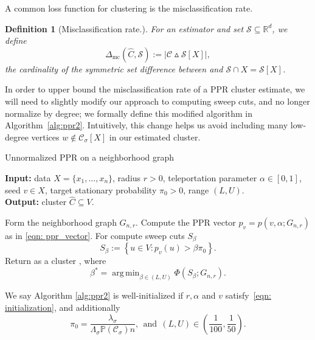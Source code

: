\documentclass[11pt,twoside]{article}
\newtheorem{definition}{Definition}
\newcommand{\set}[1]{\left\{#1\right\}}
\newcommand{\abs}[1]{\left \lvert #1 \right \rvert}
\newcommand{\Reals}{\mathbb{R}}
\newcommand{\1}{\mathbf{1}}
\newcommand{\pbf}{p}        %
\newcommand{\Xbf}{X}             %
\newcommand{\Pbb}{\mathbb{P}}
\newcommand{\Cset}{\mathcal{C}}
\newcommand{\Csig}{\Cset_{\sigma}}
\newcommand{\Cest}{\widehat{C}}
\DeclareMathOperator*{\argmin}{arg\,min}
\begin{document}
A common loss function for clustering is the misclassification rate.
\begin{definition}[Misclassification rate.]
	\label{def: symmetric_set_diff}
	For an estimator \smash{$\Cest \subseteq \Xbf$} and set
	$\mathcal{S} \subseteq \Reals^d$, we define   
	\begin{equation}
	\label{eqn: misclassification_rate}
	\Delta_{\textrm{mc}}(\Cest, \mathcal{S}) := \abs{\Cset \vartriangle \mathcal{S}[\Xbf]},
	\end{equation}
	the cardinality of the symmetric set difference between 
	\smash{$\Cest$} and $\mathcal{S} \cap \Xbf = \mathcal{S}[\Xbf]$. 
\end{definition}

In order to upper bound the misclassification rate of a PPR cluster estimate, we will need to slightly modify our approach to computing sweep cuts, and no longer normalize by degree; we formally define this modified algorithm in Algorithm~\ref{alg:ppr2}. Intuitively, this change helps us avoid including many low-degree vertices $w \not\in \Csig[\Xbf]$ in our estimated cluster.
\begin{algorithm}
	\caption{Unnormalized PPR on a neighborhood graph}
	\label{alg:ppr2}	
	{\bfseries Input:} data $\Xbf=\{x_1,\ldots,x_n\}$, radius $r > 0$, teleportation
	parameter $\alpha \in [0,1]$, seed $v \in \Xbf$, target stationary probability
	$\pi_0 > 0$, range $(L,U)$. \\     
	{\bfseries Output:} cluster $\Cest \subseteq V$.
	\begin{algorithmic}[1]
		\STATE Form the neighborhood graph $G_{n,r}$.
		\STATE Compute the PPR vector $p_v=\pbf(v, \alpha; G_{n,r})$ as in \eqref{eqn: 
			ppr_vector}. 
		\STATE For  compute sweep cuts 
		$S_{\beta}$
		\begin{equation}
		\label{eqn:sweep_cuts2}
		S_\beta := \set{u \in V: p_v(u) > \beta \pi_0}.
		\end{equation}
		\STATE Return as a cluster \smash{$\Cest_{\textrm{un}} = S_{\beta^*}$}, where  
		$$
		\beta^* = \argmin_{\beta \in (L,U)} \Phi(S_{\beta}; G_{n,r}).
		$$
	\end{algorithmic}
\end{algorithm}

We say Algorithm \ref{alg:ppr2} is well-initialized if $r,\alpha$ and $v$ satisfy~\eqref{eqn: initialization}, and additionally
\begin{equation}
\label{eqn:initialization_2}
\pi_0 = \frac{\lambda_{\sigma}}{\Lambda_{\sigma}\Pbb(\Csig)n}, ~~\textrm{and}~~ (L,U) \in \left(\frac{1}{100},\frac{1}{50}\right).
\end{equation}
\end{document}
